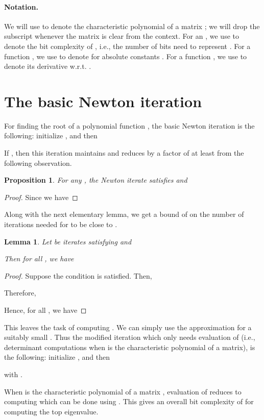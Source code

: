 \documentclass{article}[12pt]
\newtheorem{proposition}[theorem]{Proposition}
\newtheorem{lemma}[theorem]{Lemma}
\theoremstyle{definition}
\begin{document}
\paragraph{Notation.}
We will use  to denote the characteristic polynomial of a matrix ;
we will drop the subscript  whenever the matrix is clear from the context.
For an , we use  to denote the bit complexity of , i.e., the number of 
bits need to represent . 
For a function , we use  to denote  for absolute constants .
For a function , we use  to denote its  derivative w.r.t. . 

\section{The basic Newton iteration}
\label{sec:Newton}
For finding the root of a polynomial function , the basic Newton iteration is the following:
initialize , 
and then

If , then this iteration maintains  and 
reduces  by a factor of at least  from the following observation.
\begin{proposition}
For any , the Newton iterate  satisfies  and 

\end{proposition}
\begin{proof}
Since  we have

\end{proof}
Along with the next elementary lemma, we get a bound of  on the number of iterations
needed for  to be  close to . 
\begin{lemma}
\label{lem:noofits1}
Let  be iterates satisfying  and  

Then for all , we have 

\end{lemma}

\begin{proof}
Suppose the condition is satisfied. Then, 

Therefore,

Hence, for all , we have  

\end{proof}

This leaves the task of computing . We can simply use the 
approximation  for a suitably small
. Thus the modified iteration which only needs evaluation of  (i.e., determinant computations
when  is the characteristic polynomial of a matrix), 
is the following: initialize , and then 

with .
 
When  is the characteristic polynomial of a matrix , 
evaluation of  reduces to computing  which can be done 
using . This gives an 
overall bit complexity of  for computing the top eigenvalue.
\end{document}
